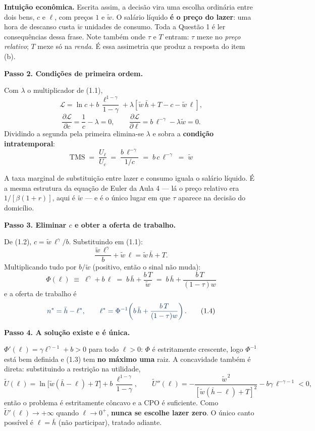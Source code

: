 \documentclass[11pt, a4paper]{article}
\newcommand{\passo}[1]{\medskip\noindent\textbf{#1}\par\nobreak}
\newcommand{\intuicao}[1]{%
  \medskip\noindent\textcolor{midblue}{\textbf{Intuição econômica.}} #1\par}
\newcommand{\resp}[1]{%
  \ifmmode {\color{darkblue}#1}\else\textcolor{darkblue}{\textbf{#1}}\fi}
\newcommand{\stst}{^{\ast}}
\newcommand{\wt}{\widetilde{w}}
\begin{document}
\intuicao{Escrita assim, a decisão vira uma escolha ordinária entre dois bens, $c$ e
$\ell$, com preços $1$ e $\wt$. O salário líquido \textbf{é o preço do lazer}: uma hora de
descanso custa $\wt$ unidades de consumo. Toda a Questão 1 é ler consequências dessa
frase. Note também onde $\tau$ e $T$ entram: $\tau$ mexe no \emph{preço relativo}; $T$
mexe só na \emph{renda}. É essa assimetria que produz a resposta do item (b).}

\passo{Passo 2. Condições de primeira ordem.}
Com $\lambda$ o multiplicador de (1.1),
\[
\mathcal{L} = \ln c + b\,\frac{\ell^{1-\gamma}}{1-\gamma}
  + \lambda\left[\wt\,\bar h + T - c - \wt\,\ell\right],
\]
\[
\frac{\partial\mathcal{L}}{\partial c} = \frac{1}{c} - \lambda = 0,
\qquad
\frac{\partial\mathcal{L}}{\partial \ell} = b\,\ell^{-\gamma} - \lambda\wt = 0 .
\]
Dividindo a segunda pela primeira elimina-se $\lambda$ e sobra a
\textbf{condição intratemporal}:
\[
\boxed{\;\mathrm{TMS} \;=\; \frac{U_\ell}{U_c}
 \;=\; \frac{b\,\ell^{-\gamma}}{1/c} \;=\; b\,c\,\ell^{-\gamma} \;=\; \wt\;}
\tag{1.2}
\]

A taxa marginal de substituição entre lazer e consumo iguala o salário líquido. É a mesma
estrutura da equação de Euler da Aula 4 --- lá o preço relativo era $1/[\beta(1+r)]$, aqui é
$\wt$ --- e é o único lugar em que $\tau$ aparece na decisão do domicílio.

\passo{Passo 3. Eliminar $c$ e obter a oferta de trabalho.}
De (1.2), $c = \wt\,\ell^{\gamma}/b$. Substituindo em (1.1):
\[
\frac{\wt\,\ell^{\gamma}}{b} + \wt\,\ell = \wt\,\bar h + T .
\]
Multiplicando tudo por $b/\wt$ (positivo, então o sinal não muda):
\[
\boxed{\;\Phi(\ell) \;\equiv\; \ell^{\gamma} + b\,\ell
 \;=\; b\,\bar h + \frac{b\,T}{\wt}
 \;=\; b\,\bar h + \frac{b\,T}{(1-\tau)w}\;}
\tag{1.3}
\]
e a oferta de trabalho é
\[
\resp{n\stst = \bar h - \ell\stst,
\qquad \ell\stst = \Phi^{-1}\!\left(b\,\bar h + \frac{b\,T}{(1-\tau)w}\right).}
\tag{1.4}
\]

\passo{Passo 4. A solução existe e é única.}
$\Phi'(\ell) = \gamma\ell^{\gamma-1} + b > 0$ para todo $\ell>0$: $\Phi$ é estritamente
crescente, logo $\Phi^{-1}$ está bem definida e (1.3) tem \textbf{no máximo uma} raiz.
A concavidade também é direta: substituindo a restrição na utilidade,
\[
\widetilde U(\ell) = \ln\!\big[\wt(\bar h - \ell) + T\big] + b\,\frac{\ell^{1-\gamma}}{1-\gamma},
\qquad
\widetilde U''(\ell) = -\frac{\wt^{\,2}}{[\wt(\bar h-\ell)+T]^{2}} - b\gamma\,\ell^{-\gamma-1} < 0 ,
\]
então o problema é estritamente côncavo e a CPO é suficiente. Como
$\widetilde U'(\ell)\to+\infty$ quando $\ell\to 0^{+}$, \textbf{nunca se escolhe lazer
zero}. O único canto possível é $\ell = \bar h$ (não participar), tratado adiante.
\end{document}
